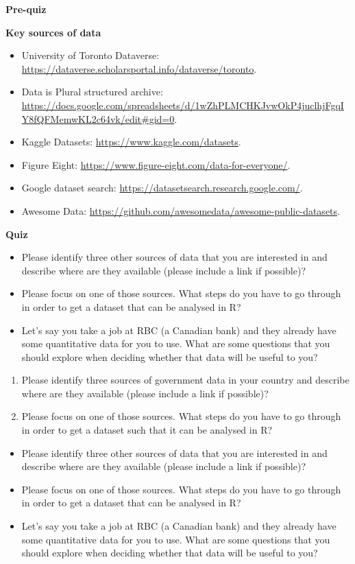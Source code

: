 \documentclass[
]{book}
\providecommand{\tightlist}{%
  \setlength{\itemsep}{0pt}\setlength{\parskip}{0pt}}
\begin{document}
\textbf{Pre-quiz}

\textbf{Key sources of data}

\begin{itemize}
\tightlist
\item
  University of Toronto Dataverse: \url{https://dataverse.scholarsportal.info/dataverse/toronto}.
\item
  Data is Plural structured archive: \url{https://docs.google.com/spreadsheets/d/1wZhPLMCHKJvwOkP4juclhjFgqIY8fQFMemwKL2c64vk/edit\#gid=0}.
\item
  Kaggle Datasets: \url{https://www.kaggle.com/datasets}.
\item
  Figure Eight: \url{https://www.figure-eight.com/data-for-everyone/}.
\item
  Google dataset search: \url{https://datasetsearch.research.google.com/}.
\item
  Awesome Data: \url{https://github.com/awesomedata/awesome-public-datasets}.
\end{itemize}

\textbf{Quiz}

\begin{itemize}
\tightlist
\item
  Please identify three other sources of data that you are interested in and describe where are they available (please include a link if possible)?
\item
  Please focus on one of those sources. What steps do you have to go through in order to get a dataset that can be analysed in R?
\item
  Let's say you take a job at RBC (a Canadian bank) and they already have some quantitative data for you to use. What are some questions that you should explore when deciding whether that data will be useful to you?
\end{itemize}

\begin{enumerate}
\def\labelenumi{\arabic{enumi}.}
\tightlist
\item
  Please identify three sources of government data in your country and describe where are they available (please include a link if possible)?
\item
  Please focus on one of those sources. What steps do you have to go through in order to get a dataset such that it can be analysed in R?
\end{enumerate}

\begin{itemize}
\tightlist
\item
  Please identify three other sources of data that you are interested in and describe where are they available (please include a link if possible)?
\item
  Please focus on one of those sources. What steps do you have to go through in order to get a dataset that can be analysed in R?
\item
  Let's say you take a job at RBC (a Canadian bank) and they already have some quantitative data for you to use. What are some questions that you should explore when deciding whether that data will be useful to you?
\end{itemize}
\end{document}
